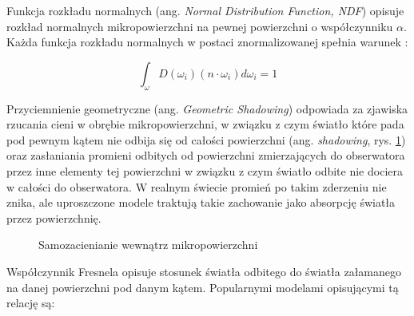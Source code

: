 \documentclass[../main.tex]{subfiles}
\begin{document}
Funkcja rozkładu normalnych (ang. \textit{Normal Distribution Function, NDF})
opisuje rozkład normalnych mikropowierzchni na pewnej powierzchni o
współczynniku $\alpha$. Każda funkcja rozkładu normalnych w postaci
znormalizowanej spełnia warunek \cite{NDFReed}:

\[
  \int_{\omega} {
    D(\omega_i)
    (n \cdot \omega_i)
    d \omega_i
  } = 1
\]

Przyciemnienie geometryczne (ang. \textit{Geometric Shadowing}) odpowiada za
zjawiska rzucania cieni w obrębie mikropowierzchni, w związku z czym światło
które pada pod pewnym kątem nie odbija się od całości powierzchni (ang.
\textit{shadowing}, rys. \ref{fig:GeometricShadowing}) oraz zasłaniania
promieni odbitych od powierzchni zmierzających do obserwatora przez inne
elementy tej powierzchni w związku z czym światło odbite nie dociera w całości
do obserwatora. W realnym świecie promień po takim zderzeniu nie znika, ale
uproszczone modele traktują takie zachowanie jako absorpcję światła przez
powierzchnię.

\begin{figure}[h]
  \centering
  \vspace{0.25cm}
  \caption{Samozacienianie wewnątrz mikropowierzchni}
	\label{fig:GeometricShadowing}
\end{figure}

Współczynnik Fresnela opisuje stosunek światła odbitego do światła załamanego
na danej powierzchni pod danym kątem. Popularnymi modelami opisującymi tą
relację są:
\end{document}

